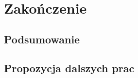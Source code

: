 \chapter{Zakończenie}
\label{Chapter9}

\section{Podsumowanie}
\label{Chapter91}


\section{Propozycja dalszych prac}
\label{Chapter92}


